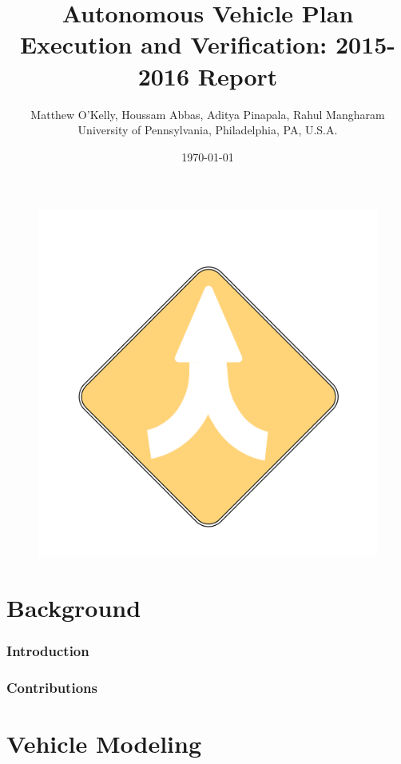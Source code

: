 \documentclass[11pt]{article}              %
\title{Autonomous Vehicle Plan Execution and Verification: 2015-2016 Report}   %
\author{Matthew O'Kelly, Houssam Abbas, Aditya Pinapala, Rahul Mangharam \\ \large University of Pennsylvania,
	Philadelphia, PA, U.S.A.\\}              %
\date{\today}                           %
\begin{document}

\begin{figure}
	\centering
	\includegraphics[scale=0.25]{figures/apexlogo}
\end{figure}

\maketitle                              %

\pagebreak
\tableofcontents                        %
\pagebreak
\part{Background}
\section{Introduction}


\section{Contributions} 
\pagebreak
\part{Vehicle Modeling}
\end{document}
